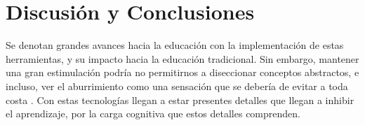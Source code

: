 \section{Discusi\'on y Conclusiones}

Se denotan grandes avances hacia la educaci{\'o}n con la implementaci{\'o}n de estas herramientas, y su impacto hacia la educaci\'on tradicional. Sin embargo, mantener una gran estimulaci\'on podr\'ia no permitirnos a diseccionar conceptos abstractos, e incluso, ver el aburrimiento como una sensaci\'on que se deber\'ia de evitar a toda costa \parencite{han2010sociedad}. Con estas tecnolog\'ias llegan a estar presentes detalles que llegan a inhibir el aprendizaje, por la carga cognitiva que estos detalles comprenden. \parencite{OJE2023100033}

